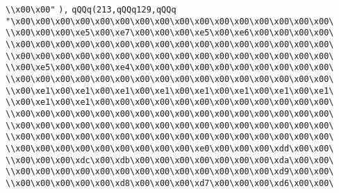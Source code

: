 \verb|\\x00\x00"|\newline
\verb|),|\newline
\verb|qQQq(213,qQQq129,qQQq|\newline
\verb|"\x00\x00\x00\x00\x00\x00\x00\x00\x00\x00\x00\x00\x00\x00\x00\x00\|\newline
\verb|\\x00\x00\x00\xe5\x00\xe7\x00\x00\x00\xe5\x00\xe6\x00\x00\x00\x00\|\newline
\verb|\\x00\x00\x00\x00\x00\x00\x00\x00\x00\x00\x00\x00\x00\x00\x00\x00\|\newline
\verb|\\x00\x00\x00\x00\x00\x00\x00\x00\x00\x00\x00\x00\x00\x00\x00\x00\|\newline
\verb|\\x00\xe5\x00\x00\x00\xe4\x00\x00\x00\x00\x00\x00\x00\x00\x00\x00\|\newline
\verb|\\x00\x00\x00\x00\x00\x00\x00\x00\x00\x00\x00\x00\x00\x00\x00\x00\|\newline
\verb|\\x00\xe1\x00\xe1\x00\xe1\x00\xe1\x00\xe1\x00\xe1\x00\xe1\x00\xe1\|\newline
\verb|\\x00\xe1\x00\xe1\x00\x00\x00\x00\x00\x00\x00\x00\x00\x00\x00\x00\|\newline
\verb|\\x00\x00\x00\x00\x00\x00\x00\x00\x00\x00\x00\x00\x00\x00\x00\x00\|\newline
\verb|\\x00\x00\x00\x00\x00\x00\x00\x00\x00\x00\x00\x00\x00\x00\x00\x00\|\newline
\verb|\\x00\x00\x00\x00\x00\x00\x00\x00\x00\x00\x00\x00\x00\x00\x00\x00\|\newline
\verb|\\x00\x00\x00\x00\x00\x00\x00\x00\x00\xe0\x00\x00\x00\xdd\x00\x00\|\newline
\verb|\\x00\x00\x00\xdc\x00\xdb\x00\x00\x00\x00\x00\x00\x00\xda\x00\x00\|\newline
\verb|\\x00\x00\x00\x00\x00\x00\x00\x00\x00\x00\x00\x00\x00\xd9\x00\x00\|\newline
\verb|\\x00\x00\x00\x00\x00\xd8\x00\x00\x00\xd7\x00\x00\x00\xd6\x00\x00\|\newline
